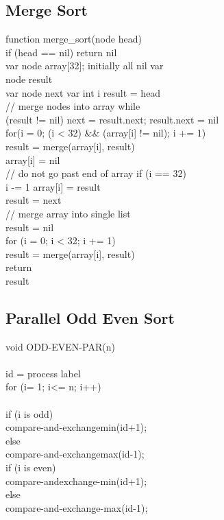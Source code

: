 \documentclass[10pt,a4paper]{article}
\begin{document}
	\subsection{Merge Sort}
	function merge\_sort(node head) 								\\ 
	if (head == nil)  	return nil 								\\
	var node array[32]; initially all nil var 					\\
	node result 												\\
	var node next var int i result = head						\\ 
	// merge nodes into array while 							\\
	(result != nil) next = result.next;  	result.next = nil 	\\
	for(i = 0; (i < 32) \&\& (array[i] != nil); i += 1) 		\\
	result = merge(array[i], result) 							\\
	array[i] = nil 												\\
	// do not go past end of array if (i == 32)					\\ 
	i -= 1 array[i] = result 									\\
	result = next 												\\
	// merge array into single list								\\ 
	result = nil 												\\
	for (i = 0; i < 32; i += 1) 								\\
		result = merge(array[i], result) 						\\
	return 														\\
	result 														\\
	
	\subsection{Parallel Odd Even Sort}
	void ODD-EVEN-PAR(n) 										\\
	{ 															\\
		id = process label 										\\
		for (i= 1; i<= n; i++) 									\\
		{ 														\\
			if (i is odd) 										\\
				compare-and-exchangemin(id+1);					\\
			else												\\
				compare-and-exchangemax(id-1);					\\
			if (i is even)										\\
				compare-andexchange-min(id+1); 					\\
			else 												\\
				compare-and-exchange-max(id-1); 				\\
		} 														\\
	}															\\
\end{document}
